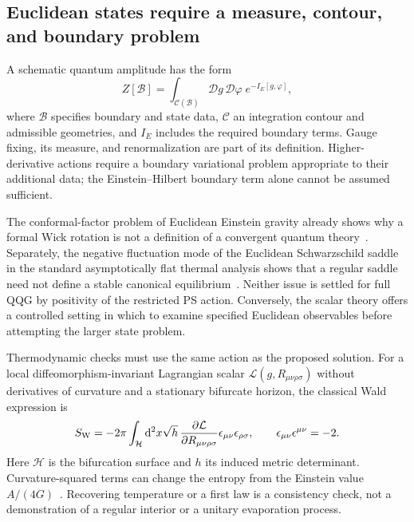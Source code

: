 \subsection{Euclidean states require a measure, contour, and boundary problem}
\label{sec:euclidean-state-problem}

A schematic quantum amplitude has the form
\begin{equation}
 Z[\mathcal{B}]=\int_{\mathcal{C}(\mathcal{B})}\mathcal{D}g\,
 \mathcal{D}\varphi\;e^{-I_E[g,\varphi]},
 \label{eq:black-hole-amplitude}
\end{equation}
where $\mathcal{B}$ specifies boundary and state data, $\mathcal{C}$ an integration contour and admissible geometries, and $I_E$ includes the required boundary terms.  Gauge fixing, its measure, and renormalization are part of its definition.  Higher-derivative actions require a boundary variational problem appropriate to their additional data; the Einstein--Hilbert boundary term alone cannot be assumed sufficient.

The conformal-factor problem of Euclidean Einstein gravity already shows why a formal Wick rotation is not a definition of a convergent quantum theory~\cite{GibbonsHawkingPerry:1978}.  Separately, the negative fluctuation mode of the Euclidean Schwarzschild saddle in the standard asymptotically flat thermal analysis shows that a regular saddle need not define a stable canonical equilibrium~\cite{GrossPerryYaffe:1982}.  Neither issue is settled for full QQG by positivity of the restricted PS action.  Conversely, the scalar theory offers a controlled setting in which to examine specified Euclidean observables before attempting the larger state problem.

Thermodynamic checks must use the same action as the proposed solution.  For a local diffeomorphism-invariant Lagrangian scalar $\mathcal{L}(g,R_{\mu\nu\rho\sigma})$ without derivatives of curvature and a stationary bifurcate horizon, the classical Wald expression is
\begin{equation}
 S_{\rm W}=-2\pi\int_{\mathcal{H}}\dd^2x\sqrt{h}\,
 \frac{\partial\mathcal{L}}{\partial R_{\mu\nu\rho\sigma}}
 \epsilon_{\mu\nu}\epsilon_{\rho\sigma},
 \qquad \epsilon_{\mu\nu}\epsilon^{\mu\nu}=-2.
 \label{eq:wald-entropy}
\end{equation}
Here $\mathcal{H}$ is the bifurcation surface and $h$ its induced metric determinant.  Curvature-squared terms can change the entropy from the Einstein value $A/(4G)$~\cite{Wald:1993}.  Recovering temperature or a first law is a consistency check, not a demonstration of a regular interior or a unitary evaporation process.


